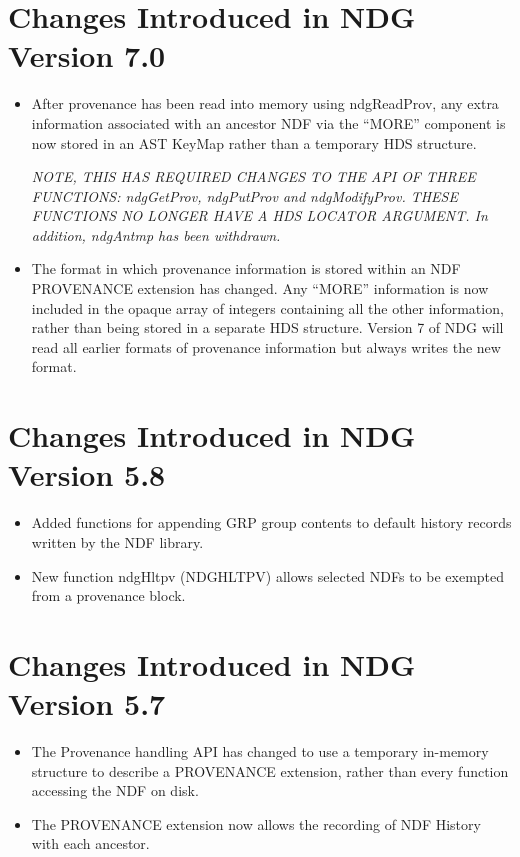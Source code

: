 \documentclass[twoside,11pt]{article}
\renewcommand{\_}{\texttt{\symbol{95}}}
\begin{document}
\section{Changes Introduced in NDG Version 7.0}
\begin{itemize}
   \item After provenance has been read into memory using ndgReadProv,
   any extra information associated with an ancestor NDF via the ``MORE''
   component is now stored in an AST KeyMap rather than a temporary HDS
   structure.

   \emph{NOTE, THIS HAS REQUIRED CHANGES TO THE API OF THREE FUNCTIONS:
   ndgGetProv, ndgPutProv and ndgModifyProv. THESE FUNCTIONS NO LONGER
   HAVE A HDS LOCATOR ARGUMENT. In addition, ndgAntmp has been withdrawn.}

   \item The format in which provenance information is stored within an
   NDF PROVENANCE extension has changed. Any ``MORE'' information is now
   included in the opaque array of integers containing all the other
   information, rather than being stored in a separate HDS structure.
   Version 7 of NDG will read all earlier formats of provenance
   information but always writes the new format.
\end{itemize}

\section{Changes Introduced in NDG Version 5.8}
\begin{itemize}
   \item Added functions for appending GRP group contents to default
    history records written by the NDF library.
   \item New function ndgHltpv (NDG\_HLTPV) allows selected NDFs to be
    exempted from a provenance block.
\end{itemize}

\section{Changes Introduced in NDG Version 5.7}
\begin{itemize}
   \item The Provenance handling API has changed to use a temporary
    in-memory structure to describe a PROVENANCE extension, rather than
    every function accessing the NDF on disk.
   \item The PROVENANCE extension now allows the recording of NDF History
    with each ancestor.
\end{itemize}
\end{document}
